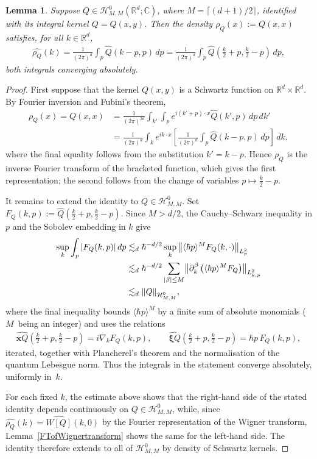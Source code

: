 \documentclass[10pt,a4paper]{article}
\newcommand{\bnorm}[1]{\bigl\|#1\bigr\|}
\theoremstyle{plain}
\newtheorem{lemma}[theorem]{Lemma}
\theoremstyle{remark}
\newcommand{\br}[1]{\left(#1\right)}
\newcommand{\tpd}{\frac{1}{(2\pi)^{d}}}
\newcommand{\sbr}[1]{\left[#1\right]}
\newcommand{\p}{\partial}
\newcommand{\jb}[1]{\langle#1\rangle}
\newcommand{\mytextfrac}[2]{{\textstyle\frac{#1}{#2}}}
\newcommand{\R}{\mathbb{R}}
\newcommand{\C}{\mathbb{C}}
\newcommand{\ceils}[1]{\lceil#1\rceil}
\begin{document}
\begin{lemma}\label{densityofoperator}
Suppose $Q\in\mathcal H^0_{M,M}(\R^d;\C)$, where $M=\ceils{(d+1)/2}$, identified with its integral kernel $Q=Q(x,y)$. Then the density $\rho_Q(x):=Q(x,x)$ satisfies, for all $k\in\R^d$,
\begin{align*}
\widehat{\rho_Q}(k)=\tpd\int_p\widehat Q(k-p,p)\,dp=\tpd\int_p\widehat Q\br{\mytextfrac{k}{2}+p,\mytextfrac{k}{2}-p}\,dp,
\end{align*}
both integrals converging absolutely.
\end{lemma}

\begin{proof}
First suppose that the kernel $Q(x,y)$ is a Schwartz function on $\R^d\times\R^d$. By Fourier inversion and Fubini's theorem,
\begin{align*}
\rho_Q(x)=Q(x,x)&=\frac{1}{(2\pi)^{2d}}\int_{k'}\int_p e^{i(k'+p)\cdot x}\widehat Q(k',p)\,dp\,dk'\\
&=\tpd\int_k e^{ik\cdot x}\sbr{\tpd\int_p\widehat Q(k-p,p)\,dp}\,dk,
\end{align*}
where the final equality follows from the substitution $k'=k-p$. Hence $\rho_Q$ is the inverse Fourier transform of the bracketed function, which gives the first representation; the second follows from the change of variables $p\mapsto\mytextfrac{k}{2}-p$.

It remains to extend the identity to $Q\in\mathcal H^0_{M,M}$. Set $F_Q(k,p):=\widehat Q\br{\mytextfrac{k}{2}+p,\mytextfrac{k}{2}-p}$. Since $M>d/2$, the Cauchy--Schwarz inequality in $p$ and the Sobolev embedding in $k$ give
\begin{align*}
\sup_k\int_p\abs{F_Q(k,p)}\,dp&\lesssim_d\hbar^{-d/2}\sup_k\norm{\jb{\hbar p}^{M}F_Q(k,\cdot)}_{L^2_p}\\
&\lesssim_d\hbar^{-d/2}\sum_{\abs{\beta}\leq M}\bnorm{\p_k^\beta\br{\jb{\hbar p}^{M}F_Q}}_{L^2_{k,p}}\\&\lesssim_d\norm{Q}_{\mathcal H^{0}_{M,M}},
\end{align*}
where the final inequality bounds $\jb{\hbar p}^{M}$ by a finite sum of absolute monomials ($M$~\hbox{being} an integer) and uses the relations
\begin{align*}
\widehat{\bm{x}Q}\br{\mytextfrac{k}{2}+p,\mytextfrac{k}{2}-p}=i\nabla_kF_Q(k,p),\qquad
\widehat{\bm{\xi}Q}\br{\mytextfrac{k}{2}+p,\mytextfrac{k}{2}-p}=\hbar p\,F_Q(k,p),
\end{align*}
iterated, together with Plancherel's theorem and the normalisation of the quantum Lebesgue norm. Thus the integrals in the statement converge absolutely, uniformly in~$k$.

For each fixed $k$, the estimate above shows that the right-hand side of the stated identity depends continuously on $Q\in\mathcal H^{0}_{M,M}$, while, since $\widehat{\rho_Q}(k)=\widehat{W[Q]}(k,0)$ by the Fourier representation of the Wigner transform, Lemma~\ref{FTofWignertransform} shows the same for the left-hand side. The identity therefore extends to all of $\mathcal H^{0}_{M,M}$ by density of Schwartz kernels.
\end{proof}
\end{document}
